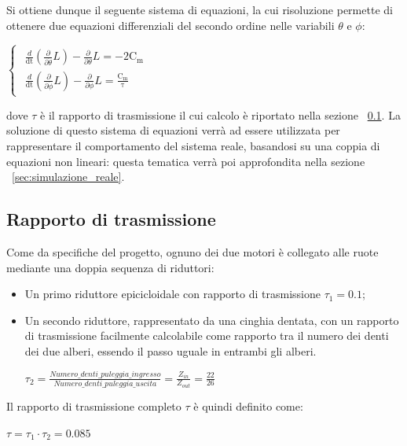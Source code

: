 \newpage
Si ottiene dunque il seguente sistema di equazioni, la cui risoluzione permette di ottenere due equazioni differenziali del secondo ordine nelle variabili $\theta$ e $\phi$:
\begin{center}
	$
	\begin{cases}
		\label{eq:lagrangiana_theta_phi}
		\begin{array}{c}
			\frac{d}{\mathrm{dt}}\left(\frac{\partial }{\partial \dot{\theta} }L\right)-\frac{\partial }{\partial \theta}L=\mathrm{-2 C_m} \\
			\frac{d}{\mathrm{dt}}\left(\frac{\partial }{\partial \dot{\phi} }L\right)-\frac{\partial }{\partial \phi}L=\mathrm{\frac{C_m}{\tau}}
		\end{array}
	\end{cases}
	$
\end{center}
dove $\tau$ è il rapporto di trasmissione il cui calcolo è riportato nella sezione ~\ref{sec:rapp_di_trasmissione}.
La soluzione di questo sistema di equazioni verrà ad essere utilizzata per rappresentare il comportamento del sistema reale, basandosi su una coppia di equazioni non lineari: questa tematica verrà poi approfondita nella sezione ~\ref{sec:simulazione_reale}.

\subsection{Rapporto di trasmissione}
\label{sec:rapp_di_trasmissione}
Come da specifiche del progetto, ognuno dei due motori è collegato alle ruote mediante una doppia sequenza di riduttori:
\begin{itemize}
	\item Un primo riduttore epicicloidale con rapporto di trasmissione $\tau_1 = 0.1$;
	\item Un secondo riduttore, rappresentato da una cinghia dentata, con un rapporto di trasmissione facilmente calcolabile come rapporto tra il numero dei denti dei due alberi, essendo il passo uguale in entrambi gli alberi.
	\begin{center}
		$\tau_2 = \frac{Numero\_denti\_puleggia\_ingresso}{Numero\_denti\_puleggia\_uscita} = \frac{Z_{in}}{Z_{out}} = \frac{22}{26}$
	\end{center}
\end{itemize}

Il rapporto di trasmissione completo $\tau$ è quindi definito come:
\begin{center}
	$\tau = \tau_1 \cdot{\tau_2} = 0.085$	
\end{center}


